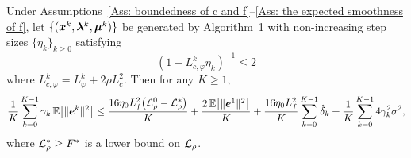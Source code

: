 \documentclass[10pt]{article}
\begin{document}

\begin{lemma}\label{lm: the variance reduction}
Under Assumptions~\ref{Ass: boundedness of c and f}--\ref{Ass: the expected
smoothness of f}, let $\{(\bm{x}^k,\bm{\lambda}^k,\bm{\mu}^k)\}$ be generated by
Algorithm~1 with non-increasing step sizes $\{\eta_k\}_{k\geq 0}$ satisfying
\begin{equation}\label{eq:step-cond}
    (1 - L_{c,\varphi}^k \eta_k)^{-1} \leq 2
\end{equation} where \(L_{c,\varphi}^k = L_{\varphi}^k + 2 \rho L_c^2\). Then for any $K \geq 1$,
\begin{equation}\label{eq:main-bound}
    \frac{1}{K}\sum_{k=0}^{K-1}\gamma_k\,\mathbb{E}\!\left[\|\bm{e}^k\|^2\right]
    \leq
    \frac{16\eta_0 L_f^2\bigl(\mathcal{L}_\rho^0 - \mathcal{L}_\rho^*\bigr)}{K}
    + \frac{2\,\mathbb{E}\!\left[\|\bm{e}^1\|^2\right]}{K}
    + \frac{16\eta_0 L_f^2}{K}\sum_{k=0}^{K-1}\hat{\delta}_k
    + \frac{1}{K}\sum_{k=0}^{K-1}4\gamma_k^2\sigma^2,
\end{equation}
where $\mathcal{L}_\rho^* \geq F^*$ is a lower bound on $\mathcal{L}_\rho$.
\end{lemma}


\end{document}
